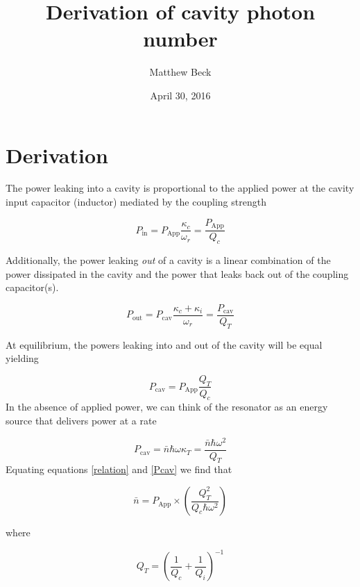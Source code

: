 \documentclass[12pt,reqno]{amsart}
\title{\vspace{-1.7cm}Derivation of cavity photon number}
\author{Matthew Beck}
\date{\vspace{-.5cm}April 30, 2016} %
\begin{document}
\maketitle
\setlength{\parindent}{0pt}

\printnomenclature[6cm]

\section*{Derivation}

The power leaking into a cavity is proportional to the applied power at the cavity input capacitor (inductor) mediated by the coupling strength

\begin{equation}
P_{\text{in}} = P_{\text{App}} \frac{\kappa_c}{\omega_r} = \frac{P_{\text{App}}}{Q_c}
\end{equation}

Additionally, the power leaking \textit{out} of a cavity is a linear combination of the power dissipated in the cavity and the power that leaks back out of the coupling capacitor(s).

\begin{equation}
P_{\text{out}} = P_{\text{cav}} \frac{\kappa_c + \kappa_i}{\omega_r} = \frac{P_{\text{cav}}}{Q_T}
\end{equation}

At equilibrium, the powers leaking into and out of the cavity will be equal yielding

\begin{equation}\label{relation}
P_{\text{cav}} = P_{\text{App}} \frac{Q_T}{Q_c} 
\end{equation}
\setlength{\parindent}{0pt}
In the absence of applied power, we can think of the resonator as an energy source that delivers power at a rate

\begin{equation}\label{Pcav}
P_{\text{cav}} = \bar{n}\hbar \omega \kappa_T= \frac{\bar{n} \hbar \omega^2}{Q_T}
\end{equation}
Equating equations \eqref{relation} and \eqref{Pcav} we find that

\begin{equation}
\bar{n} = P_\text{App} \times \left(\frac{Q_T^2}{Q_c \hbar \omega^2}\right)
\end{equation}

where 

\begin{equation}
Q_T = \left( \frac{1}{Q_c} + \frac{1}{Q_i} \right)^{-1}
\end{equation}
\end{document}
